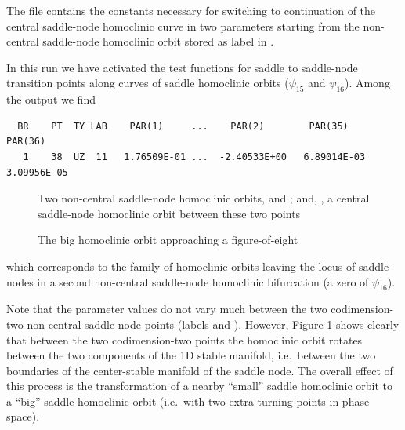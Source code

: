 \documentclass[12pt]{report}
\begin{document}
The file  contains the constants necessary 
for switching to continuation of the central saddle-node homoclinic curve 
in two parameters starting from the non-central saddle-node homoclinic orbit
stored as label  in .
\begin{center}
\end{center}
In this run we have activated the test functions for saddle to saddle-node
transition points along curves of saddle homoclinic orbits ($\psi_{15}$ and 
$\psi_{16}$). Among the output we find
\begin{verbatim}
  BR    PT  TY LAB    PAR(1)     ...    PAR(2)        PAR(35)       PAR(36)    
   1    38  UZ  11   1.76509E-01 ...  -2.40533E+00   6.89014E-03   3.09956E-05
\end{verbatim}
\begin{figure}[p]
\epsfysize 9.0cm
\centerline{}
\caption{Two non-central saddle-node homoclinic orbits,  and ;
and, , a central saddle-node homoclinic orbit between
these two points \label{kf.7}}
\end{figure}
\begin{figure}[p]
\epsfysize 9.0cm
\centerline{}
\caption{The big homoclinic orbit approaching a figure-of-eight}
\label{kp.8}
\end{figure}
%
which corresponds to the family of homoclinic orbits leaving
the locus of saddle-nodes in a second non-central saddle-node
homoclinic bifurcation (a zero of $\psi_{16}$). 

Note that the parameter values do not vary much between the
two codimension-two non-central saddle-node points (labels  and ).
However, Figure \ref{kf.7} shows clearly that between the two
codimension-two points 
the homoclinic orbit
rotates between the two components of the 1D stable manifold, i.e.\
between the two boundaries of the center-stable manifold of the saddle
node. The overall effect of this process is the transformation of a
nearby ``small'' saddle homoclinic orbit to a ``big'' saddle
homoclinic orbit (i.e.\ with two extra turning points in phase space).  
\end{document}

